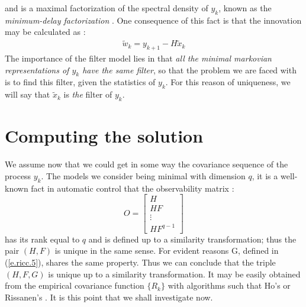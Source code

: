 and is a maximal factorization of the spectral density of $y_k$, 
known as the {\em minimum-delay factorization} 
. One consequence of this fact
is that the innovation may be calculated as :
\begin{eqnarray}
\tilde{w}_k=y_{k+1}-H\tilde{x}_k 
\label{e.ricc.18}
\end{eqnarray}
The importance of the filter model lies
in that {\em all the minimal markovian representations of $y_k$ have the same filter}, so that the problem we are faced with is to find this filter,
given the statistics of $y_k$. For this reason of uniqueness, 
we will say that $\tilde{x}_k$ is {\em the} filter of $y_k$. 
\section{Computing the solution}
We assume now that we could get in some way the covariance sequence of the 
process $y_k$.
The models we consider being minimal with dimension $q$, 
it is a well-known fact in automatic control that the observability matrix
:
\begin{equation}
O=\left[ \begin{array}{c}H\\HF\\\vdots\\HF^{q-1}\end{array}\right]
\label{e.ricc.19}
\end{equation}
has its rank equal to $q$ and is defined up to a similarity transformation; 
thus the pair $(H, F)$ is unique in the same sense.
For evident reasons G, defined in  (\ref{e.ricc.5}), shares the same property.
Thus we can conclude that the triple $(H, F, G)$ is unique up 
to a similarity transformation. It may be easily obtained from the empirical
covariance function $\{R_k\} $ with algorithms such that Ho's \cite{ho} 
or Rissanen's \cite{rissanen}. 
It is this point that we shall investigate now.
